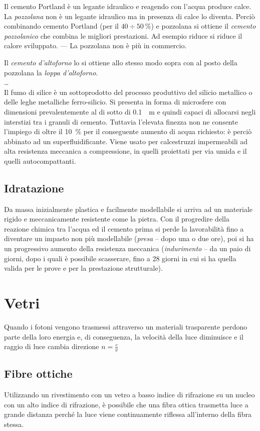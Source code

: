 \documentclass[a5paper,12pt]{article}
\begin{document}
Il cemento Portland è un legante idraulico e reagendo con l'acqua produce calce. La \emph{pozzolana} non è un legante idraulico ma in presenza di calce lo diventa. Perciò combinando cemento Portland (per il $40\div\SI{50}{\%}$) e pozzolana si ottiene il \emph{cemento pozzolanico} che combina le migliori prestazioni. Ad esempio riduce si riduce il calore sviluppato. --- La pozzolana non è più in commercio.

Il \emph{cemento d'altoforno} lo si ottiene allo stesso modo sopra con al posto della pozzolana la \emph{loppa d'altoforno}.\\ \dots\\
Il fumo di silice è un sottoprodotto del processo produttivo del silicio metallico o delle leghe metalliche ferro-silicio. Si presenta in forma di microsfere con dimensioni prevalentemente al di sotto di \SI{0.1}{\mu m} e quindi capaci di allocarsi negli interstizi tra i granuli di cemento. Tuttavia l'elevata finezza non ne consente l'impiego di oltre il \SI{10}{\%} per il conseguente aumento di acqua richiesto: è perciò abbinato ad un superfluidificante. Viene usato per calcestruzzi impermeabili ad alta resistenza meccanica a compressione, in quelli proiettati per via umida e il quelli autocompattanti. 
\subsection{Idratazione}
Da massa inizialmente plastica e facilmente modellabile si arriva ad un materiale rigido e meccanicamente resistente come la pietra. Con il progredire della reazione chimica tra l'acqua ed il cemento prima si perde la lavorabilità fino a diventare un impasto non più modellabile (\emph{presa} -- dopo una o due ore), poi si ha un progressivo aumento della resistenza meccanica (\emph{indurimento} -- da un paio di giorni, dopo i quali è possibile scasserare, fino a 28 giorni in cui si ha quella valida per le prove e per la prestazione strutturale).
\section{Vetri}
Quando i fotoni vengono trasmessi attraverso un materiali trasparente perdono parte della loro energia e, di conseguenza, la velocità della luce diminuisce e il raggio di luce cambia direzione $n=\frac{c}{\nu}$
\subsection{Fibre ottiche}
Utilizzando un rivestimento con un vetro a basso indice di rifrazione su un nucleo con un alto indice di rifrazione, è possibile che una fibra ottica trasmetta luce a grande distanza perché la luce viene continuamente riflessa all'interno della fibra stessa.
\end{document}
